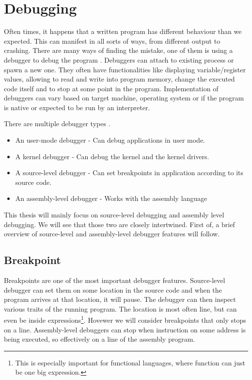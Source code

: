 \chapter{Debugging}
Often times, it happens that a written program has different behaviour than we expected. This can manifest in all sorts of ways, from different output to crashing. There are many ways of finding the mistake, one of them is using a debugger to debug the program \cite{software-debugging-testing-verification}.
Debuggers can attach to existing process or spawn a new one. They often have functionalities like displaying variable/register values, allowing to read and write into program memory, change the executed code itself and to stop at some point in the program. Implementation of debuggers can vary based on target machine, operating system or if the program is native or expected to be run by an interpreter.

There are multiple debugger types .
\begin{itemize}
    \item An user-mode debugger - Can debug applications in user mode.
    \item A kernel debugger - Can debug the kernel and the kernel drivers.
    \item A source-level debugger - Can set breakpoints in application according to its source code.
    \item An assembly-level debugger - Works with the assembly language
\end{itemize}

This thesis will mainly focus on source-level debugging and assembly level debugging. We will see that those two are closely intertwined. First of, a brief overview of source-level and assembly-level debugger features will follow.

\section{Breakpoint}\label{breakpoint}
Breakpoints are one of the most important debugger features. Source-level debugger can set them on some location in the source code and when the program arrives at that location, it will pause. The debugger can then inspect various traits of the running program. The location is most often line, but can even be inside expressions\footnote{This is especially important for functional languages, where function can just be one big expression.}. Hovewer we will consider breakpoints that only stops on a line. Assembly-level debuggers can stop when instruction on some address is being executed, so effectively on a line of the assembly program.

